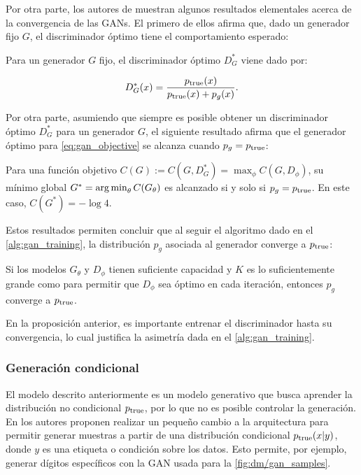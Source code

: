 Por otra parte, los autores de \cite{goodfellow2014generative} muestran algunos resultados elementales acerca de la convergencia de las GANs. El primero de ellos afirma que, dado un generador fijo $G$, el discriminador óptimo tiene el comportamiento esperado:

\begin{prop}
    Para un generador $G$ fijo, el discriminador óptimo $D^*_G$ viene dado por:

    \begin{equation*}
        D^*_G(x) = \frac{p_{\operatorname{true}}(x)}{p_{\operatorname{true}}(x) + p_g(x)}.
    \end{equation*}
\end{prop}

Por otra parte, asumiendo que siempre es posible obtener un discriminador óptimo $D_G^*$ para un generador $G$, el siguiente resultado afirma que el generador óptimo para \eqref{eq:gan_objective} se alcanza cuando $p_g=p_{\operatorname{true}}$:

\begin{prop}
    Para una función objetivo $C(G):=C(G, D_G^*) = \max_\phi C(G, D_\phi)$, su mínimo global $G^*=\operatorname*{arg\,min}_\theta C(G_\theta)$ es alcanzado si y solo si $p_g=p_{\operatorname{true}}$. En este caso, $C(G^*)=-\log 4$.
\end{prop}

Estos resultados permiten concluir que al seguir el algoritmo dado en el \autoref{alg:gan_training}, la distribución $p_g$ asociada al generador converge a $p_{\operatorname{true}}$:

\begin{prop}
    Si los modelos $G_\theta$ y $D_\phi$ tienen suficiente capacidad y $K$ es lo suficientemente grande como para permitir que $D_\phi$ sea óptimo en cada iteración, entonces $p_g$ converge a $p_{\operatorname{true}}$.
\end{prop}

En la proposición anterior, es importante entrenar el discriminador hasta su convergencia, lo cual justifica la asimetría dada en el \autoref{alg:gan_training}.

\subsubsection{Generación condicional}

El modelo descrito anteriormente es un modelo generativo que busca aprender la distribución no condicional $p_{\operatorname{true}}$, por lo que no es posible controlar la generación. En \cite{mirza2014conditional} los autores proponen realizar un pequeño cambio a la arquitectura para  permitir generar muestras a partir de una distribución condicional $p_{\operatorname{true}}(x|y)$, donde $y$ es una etiqueta o condición sobre los datos. Esto permite, por ejemplo, generar dígitos específicos con la GAN usada para la \autoref{fig:dm/gan_samples}.

